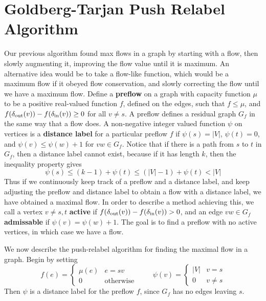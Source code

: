 \section{Goldberg-Tarjan Push Relabel Algorithm}

Our previous algorithm found max flows in a graph by starting with a flow, then slowly augmenting it, improving the flow value until it is maximum. An alternative idea would be to take a flow-like function, which would be a maximum flow if it obeyed flow conservation, and slowly correcting the flow until we have a maximum flow. Define a {\bf preflow} on a graph with capacity function $\mu$ to be a positive real-valued function $f$, defined on the edges, such that $f \leq \mu$, and $f(\operatorname{\delta_{\text{out}}}(v)) - f(\operatorname{\delta_{\text{in}}}(v)) \geq 0$ for all $v \neq s$. A preflow defines a residual graph $G_f$ in the same way that a flow does. A non-negative integer valued function $\psi$ on vertices is a {\bf distance label} for a particular preflow $f$ if $\psi(s) = |V|$, $\psi(t) = 0$, and $\psi(v) \leq \psi(w) + 1$ for $vw \in G_f$. Notice that if there is a path from $s$ to $t$ in $G_f$, then a distance label cannot exist, because if it has length $k$, then the inequality property gives
%
\[ \psi(s) \leq (k-1) + \psi(t) \leq (|V|-1) + \psi(t) < |V| \]
%
Thus if we continuously keep track of a preflow and a distance label, and keep adjusting the preflow and distance label to obtain a flow with a distance label, we have obtained a maximal flow. In order to describe a method achieving this, we call a vertex $v \neq s,t$ {\bf active} if $f(\operatorname{\delta_{\text{out}}}(v)) - f(\operatorname{\delta_{\text{in}}}(v)) > 0$, and an edge $vw \in G_f$ {\bf admissable} if $\psi(v) = \psi(w) + 1$. The goal is to find a preflow with no active vertices, in which case we have a flow.

We now describe the push-relabel algorithm for finding the maximal flow in a graph. Begin by setting
%
\[ f(e) = \begin{cases} \mu(e) & e = sv \\ 0 & \text{otherwise} \end{cases}\ \ \ \ \ \ \ \ \ \ \psi(v) = \begin{cases} |V| & v = s \\ 0 & v \neq s \end{cases} \]
%
Then $\psi$ is a distance label for the preflow $f$, since $G_f$ has no edges leaving $s$.

